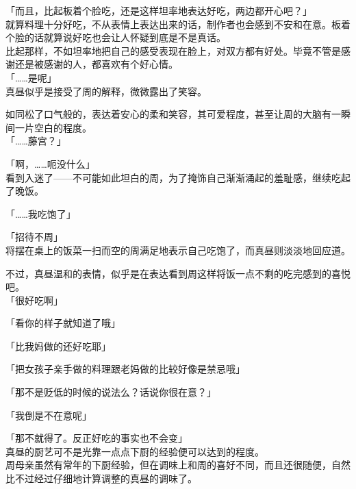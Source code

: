 「而且，比起板着个脸吃，还是这样坦率地表达好吃，两边都开心吧？」\\

就算料理十分好吃，不从表情上表达出来的话，制作者也会感到不安和在意。板着个脸的话就算说好吃也会让人怀疑到底是不是真话。\\

比起那样，不如坦率地把自己的感受表现在脸上，对双方都有好处。毕竟不管是感谢还是被感谢的人，都喜欢有个好心情。\\

「……是呢」\\

真昼似乎是接受了周的解释，微微露出了笑容。

如同松了口气般的，表达着安心的柔和笑容，其可爱程度，甚至让周的大脑有一瞬间一片空白的程度。\\

「……藤宫？」

「啊，……呃没什么」\\

看到入迷了——不可能如此坦白的周，为了掩饰自己渐渐涌起的羞耻感，继续吃起了晚饭。\\

\vspace{2\baselineskip}

「……我吃饱了」

「招待不周」\\

将摆在桌上的饭菜一扫而空的周满足地表示自己吃饱了，而真昼则淡淡地回应道。

不过，真昼温和的表情，似乎是在表达看到周这样将饭一点不剩的吃完感到的喜悦吧。\\

「很好吃啊」

「看你的样子就知道了哦」

「比我妈做的还好吃耶」

「把女孩子亲手做的料理跟老妈做的比较好像是禁忌哦」

「那不是贬低的时候的说法么？话说你很在意？」

「我倒是不在意呢」

「那不就得了。反正好吃的事实也不会变」\\

真昼的厨艺可不是光靠一点点下厨的经验便可以达到的程度。\\

周母亲虽然有常年的下厨经验，但在调味上和周的喜好不同，而且还很随便，自然比不过经过仔细地计算调整的真昼的调味了。\\

